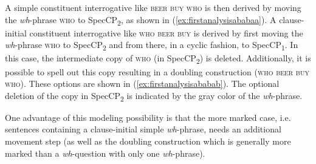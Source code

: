 A simple constituent interrogative like \textsc{beer buy who} is then derived by moving the \textit{wh}-phrase \textsc{who} to SpecCP\textsubscript{2}, as shown in (\ref{ex:firstanalysisababaa}). A clause-initial constituent interrogative like \textsc{who beer buy} is derived by first moving the \textit{wh}-phrase \textsc{who} to SpecCP\textsubscript{2} and from there, in a cyclic fashion, to SpecCP\textsubscript{1}. In this case, the intermediate copy of \textsc{who} (in SpecCP\textsubscript{2}) is deleted. Additionally, it is possible to spell out this copy resulting in a doubling construction (\textsc{who beer buy who}). These options are shown in (\ref{ex:firstanalysisababab}). The optional deletion of the copy in SpecCP\textsubscript{2} is indicated by the gray color of the \textit{wh}-phrase.


One advantage of this modeling possibility is that the more marked case, i.e. sentences containing a clause-initial simple \textit{wh}-phrase, needs an additional movement step (as well as the doubling construction which is generally more marked than a \textit{wh}-question with only one \textit{wh}-phrase).




